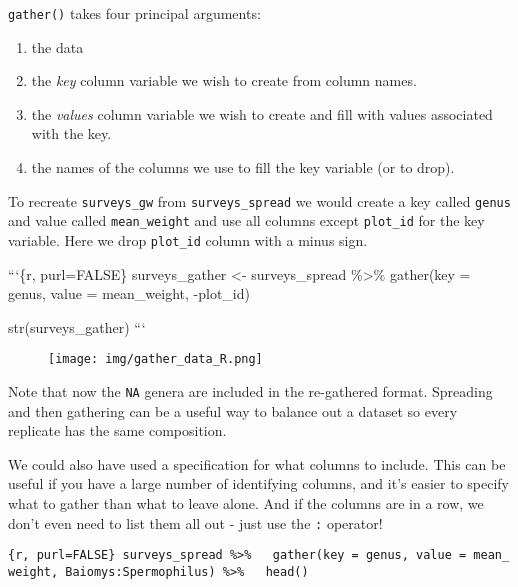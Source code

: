 \documentclass[]{article}
\providecommand{\tightlist}{%
  \setlength{\itemsep}{0pt}\setlength{\parskip}{0pt}}
\begin{document}
\texttt{gather()} takes four principal arguments:

\begin{enumerate}
\def\labelenumi{\arabic{enumi}.}
\tightlist
\item
  the data
\item
  the \emph{key} column variable we wish to create from column names.
\item
  the \emph{values} column variable we wish to create and fill with
  values associated with the key.
\item
  the names of the columns we use to fill the key variable (or to drop).
\end{enumerate}

To recreate \texttt{surveys\_gw} from \texttt{surveys\_spread} we would
create a key called \texttt{genus} and value called
\texttt{mean\_weight} and use all columns except \texttt{plot\_id} for
the key variable. Here we drop \texttt{plot\_id} column with a minus
sign.

```\{r, purl=FALSE\} surveys\_gather \textless{}- surveys\_spread
\%\textgreater{}\% gather(key = genus, value = mean\_weight, -plot\_id)

str(surveys\_gather) ```

\begin{figure}
\centering
\texttt{[image: img/gather\_data\_R.png]}
\caption{}
\end{figure}

Note that now the \texttt{NA} genera are included in the re-gathered
format. Spreading and then gathering can be a useful way to balance out
a dataset so every replicate has the same composition.

We could also have used a specification for what columns to include.
This can be useful if you have a large number of identifying columns,
and it's easier to specify what to gather than what to leave alone. And
if the columns are in a row, we don't even need to list them all out -
just use the \texttt{:} operator!

\texttt{\{r,\ purl=FALSE\}\ surveys\_spread\ \%\textgreater{}\%\ \ \ gather(key\ =\ genus,\ value\ =\ mean\_weight,\ Baiomys:Spermophilus)\ \%\textgreater{}\%\ \ \ head()}
\end{document}
